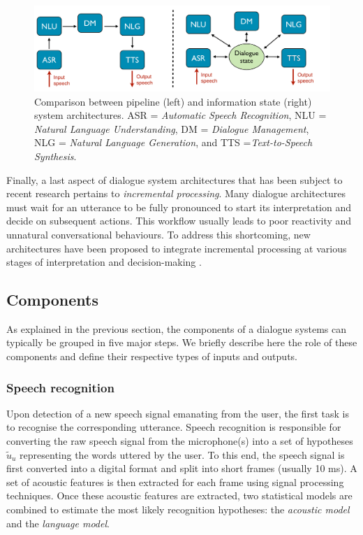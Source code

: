  \begin{figure}[h!]
\centering
\includegraphics[scale=0.28]{imgs/architecture_comparison.pdf}
\caption{Comparison between pipeline (left) and information state (right) system architectures.   ASR = \textit{Automatic Speech Recognition}, NLU = \textit{Natural Language Understanding}, DM = \textit{Dialogue Management}, NLG = \textit{Natural Language Generation}, and TTS =\textit{Text-to-Speech Synthesis}.}
\label{fig:architecture_comp}
\end{figure}

Finally, a last aspect of dialogue system architectures that has been subject to recent research pertains to \textit{incremental processing}.  Many dialogue architectures must wait for an utterance to be fully pronounced to start its interpretation and decide on subsequent actions.  This workflow usually leads to poor reactivity and unnatural conversational behaviours.  To address this shortcoming, new architectures have been proposed to integrate incremental processing at various stages of interpretation and decision-making \citep{schlangen2009general}.


\subsection{Components}

As explained in the previous section, the components of a dialogue systems can typically be grouped in five major steps.  We briefly describe here the role of these components and define their respective types of inputs and outputs.

\subsubsection*{Speech recognition}
Upon detection of a new speech signal emanating from the user, the first task is to recognise the corresponding utterance. Speech recognition is responsible for converting the raw speech signal from the microphone(s) into a set of hypotheses $\tilde{u}_u$ representing the words uttered by the user. To this end, the speech signal is first converted into a digital format and split into short frames (usually 10 ms). A set of acoustic features is then extracted for each frame using signal processing techniques.  Once these acoustic features are extracted, two statistical models are combined to estimate the most likely recognition hypotheses: the \textit{acoustic model} and the \textit{language model}.  

